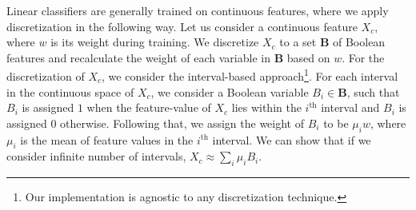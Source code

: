 Linear classifiers are generally trained on continuous features, where we apply discretization in the following way. Let us consider a continuous feature $X_c$, where $w$ is its weight during training. We discretize $ X_c $ to a set $ \mathbf{B} $ of Boolean features and recalculate the weight of each variable in $ \mathbf{B} $ based on $ w $. For the discretization of $X_c$, we consider the interval-based approach\footnote{Our implementation is agnostic to any discretization technique.}. For each interval in the continuous space of $X_c$, we consider a Boolean variable $B_i \in \mathbf{B}$, such that $ B_i $ is assigned $ 1 $ when the feature-value of $X_c$ lies within the $i^{\mathrm{th}}$ interval and $ B_i $ is assigned $ 0 $ otherwise. Following that, we assign the weight of $ B_i $ to be $ \mu_iw $, where $ \mu_i $ is the mean of feature values in the $i^{\mathrm{th}}$ interval. We can show that if we consider infinite number of intervals, $ X_c \approx \sum_i \mu_i B_i $. 



